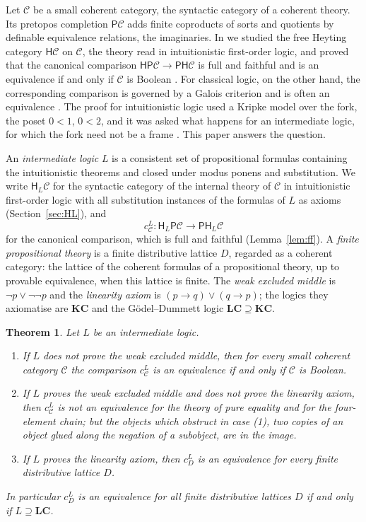 \documentclass[11pt]{amsart}
\newtheorem{thm}{Theorem}[section]
\theoremstyle{definition}
\newcommand{\PP}{\mathsf P}
\newcommand{\HH}{\mathsf H}
\newcommand{\cC}{\mathcal C}
\newcommand{\LC}{\mathbf{LC}}
\newcommand{\KC}{\mathbf{KC}}
\begin{document}
Let $\cC$ be a small coherent category, the syntactic category of a
coherent theory. Its pretopos completion $\PP\cC$ adds finite
coproducts of sorts and quotients by definable equivalence relations,
the imaginaries. In \cite{Heyting} we studied the free Heyting category
$\HH\cC$ on $\cC$, the theory read in intuitionistic first-order logic,
and proved that the canonical comparison $\HH\PP\cC\to\PP\HH\cC$ is full
and faithful and is an equivalence if and only if $\cC$ is Boolean
\cite[Thm.~1.1]{Heyting}. For classical logic, on the other hand, the
corresponding comparison is governed by a Galois criterion and is
often an equivalence \cite{Morley}. The proof for intuitionistic logic
used a Kripke model over the fork, the poset $0<1$, $0<2$, and it was
asked what happens for an intermediate logic, for which the fork need
not be a frame \cite[\S9]{Heyting}. This paper answers the question.

An \emph{intermediate logic} $L$ is a consistent set of propositional
formulas containing the intuitionistic theorems and closed under modus
ponens and substitution. We write $\HH_L\cC$ for the syntactic category
of the internal theory of $\cC$ in intuitionistic first-order logic
with all substitution instances of the formulas of $L$ as axioms
(Section~\ref{sec:HL}), and
\[
c^L_\cC\colon\HH_L\PP\cC\longrightarrow\PP\HH_L\cC
\]
for the canonical comparison, which is full and faithful
(Lemma~\ref{lem:ff}). A \emph{finite propositional theory} is a finite
distributive lattice $D$, regarded as a coherent category: the
lattice of the coherent formulas of a propositional theory, up to
provable equivalence, when this lattice is finite. The \emph{weak excluded middle} is $\neg
p\vee\neg\neg p$ and the \emph{linearity axiom} is $(p\to q)\vee(q\to
p)$; the logics they axiomatise are $\KC$ and the G\"odel--Dummett
logic $\LC\supseteq\KC$.

\begin{thm}\label{thm:main}
Let $L$ be an intermediate logic.
\begin{enumerate}
\item[(1)] If $L$ does not prove the weak excluded middle, then for
every small coherent category $\cC$ the comparison $c^L_\cC$ is an
equivalence if and only if $\cC$ is Boolean.
\item[(2)] If $L$ proves the weak excluded middle and does not prove
the linearity axiom, then $c^L_\cC$ is not an equivalence for the
theory of pure equality and for the four-element chain; but the
objects which obstruct in case \textup{(1)}, two copies of an object
glued along the negation of a subobject, are in the image.
\item[(3)] If $L$ proves the linearity axiom, then $c^L_D$ is an
equivalence for every finite distributive lattice $D$.
\end{enumerate}
In particular $c^L_D$ is an equivalence for all finite distributive
lattices $D$ if and only if $L\supseteq\LC$.
\end{thm}
\end{document}
